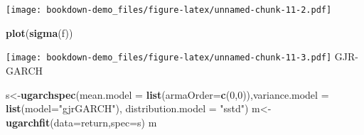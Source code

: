\documentclass[
  12pt,
  a4paper,
  openany]{book}
\newenvironment{Shaded}{\begin{snugshade}}{\end{snugshade}}
\newcommand{\DataTypeTok}[1]{\textcolor[rgb]{0.13,0.29,0.53}{#1}}
\newcommand{\DecValTok}[1]{\textcolor[rgb]{0.00,0.00,0.81}{#1}}
\newcommand{\KeywordTok}[1]{\textcolor[rgb]{0.13,0.29,0.53}{\textbf{#1}}}
\newcommand{\NormalTok}[1]{#1}
\newcommand{\StringTok}[1]{\textcolor[rgb]{0.31,0.60,0.02}{#1}}
\begin{document}
\texttt{[image: bookdown-demo\_files/figure-latex/unnamed-chunk-11-2.pdf]}

\begin{Shaded}
\begin{Highlighting}[]
\KeywordTok{plot}\NormalTok{(}\KeywordTok{sigma}\NormalTok{(f))}
\end{Highlighting}
\end{Shaded}

\texttt{[image: bookdown-demo\_files/figure-latex/unnamed-chunk-11-3.pdf]}
GJR-GARCH

\begin{Shaded}
\begin{Highlighting}[]
\NormalTok{s\textless{}{-}}\KeywordTok{ugarchspec}\NormalTok{(}\DataTypeTok{mean.model =} \KeywordTok{list}\NormalTok{(}\DataTypeTok{armaOrder=}\KeywordTok{c}\NormalTok{(}\DecValTok{0}\NormalTok{,}\DecValTok{0}\NormalTok{)),}\DataTypeTok{variance.model =} \KeywordTok{list}\NormalTok{(}\DataTypeTok{model=}\StringTok{"gjrGARCH"}\NormalTok{),}
              \DataTypeTok{distribution.model =} \StringTok{"sstd"}\NormalTok{)}
\NormalTok{m\textless{}{-}}\KeywordTok{ugarchfit}\NormalTok{(}\DataTypeTok{data=}\NormalTok{return,}\DataTypeTok{spec=}\NormalTok{s)}
\NormalTok{m}
\end{Highlighting}
\end{Shaded}
\end{document}
